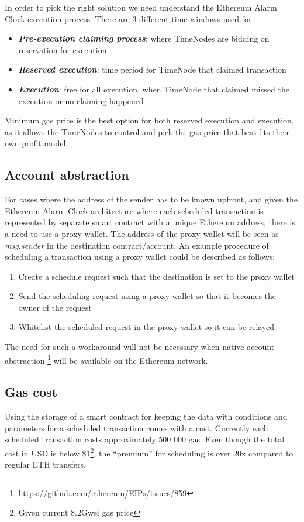 \documentclass{report}
\begin{document}
  In order to pick the right solution we need understand the Ethereum Alarm Clock execution process. There are 3 different time windows used for:
  \begin{itemize}
    \item \textbf{\textit{Pre-execution claiming process}}: where TimeNodes are bidding on reservation for execution
    \item \textbf{\textit{Reserved execution}}: time period for TimeNode that claimed transaction
    \item \textbf{\textit{Execution}}: free for all execution, when TimeNode that claimed missed the execution or no claiming happened
  \end{itemize}
  Minimum gas price is the best option for both reserved execution and execution, as it allows the TimeNodes to control and pick the gas price that best fits their own profit model.

  \subsection{Account abstraction}
  For cases where the address of the sender has to be known upfront, and given the Ethereum Alarm Clock architecture where each scheduled transaction is represented by separate smart contract with a unique Ethereum address, there is a need to use a proxy wallet.
  The address of the proxy wallet will be seen as \textit{msg.sender} in the destination contract/account. An example procedure of scheduling a transaction using a proxy wallet could be described as follows:
  \begin{enumerate}
    \item Create a schedule request such that the destination is set to the proxy wallet
    \item Send the scheduling request using a proxy wallet so that it becomes the owner of the request
    \item Whitelist the scheduled request in the proxy wallet so it can be relayed
  \end{enumerate}

  The need for such a workaround will not be necessary when native account abstraction \footnote{https://github.com/ethereum/EIPs/issues/859} will be available on the Ethereum network.

  \subsection{Gas cost}
  Using the storage of a smart contract for keeping the data with conditions and parameters for a scheduled transaction comes with a cost. Currently each scheduled transaction costs approximately 500 000 gas. Even though the total cost in USD is below \$1\footnote{Given current 8.2Gwei gas price}, the “premium” for scheduling is over 20x compared to regular ETH transfers.
\end{document}
